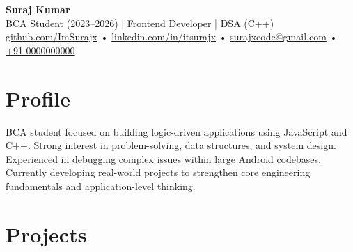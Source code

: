 \begin{center}
	{\fontsize{24}{26}\selectfont \textbf{Suraj Kumar}}\\
	\vspace{4pt}
	{\small BCA Student (2023--2026) | Frontend Developer | DSA (C++)}\\
	\vspace{6pt}
	\href{https://github.com/ImSurajx}{github.com/ImSurajx}
	\quad • \quad
	\href{https://www.linkedin.com/in/itsurajx}{linkedin.com/in/itsurajx}
	\quad • \quad
	\href{mailto:surajxcode@gmail.com}{surajxcode@gmail.com}
	\quad • \quad
	\href{tel:+910000099999}{+91 0000000000}
\end{center}

\section*{Profile}

BCA student focused on building logic-driven applications using JavaScript and C++. Strong interest in problem-solving, data structures, and system design. Experienced in debugging complex issues within large Android codebases. Currently developing real-world projects to strengthen core engineering fundamentals and application-level thinking.

\section*{Projects}

